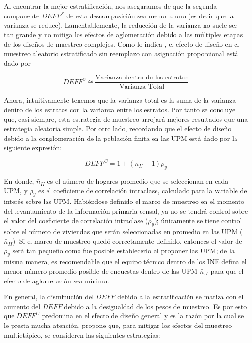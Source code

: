 \documentclass[
  12pt,
  spanish,
]{book}
\begin{document}
Al encontrar la mejor estratificación, nos aseguramos de que la segunda componente \(DEFF^S\) de esta descomposición sea menor a uno (es decir que la varianza se reduce). Lamentablemente, la reducción de la varianza no suele ser tan grande y no mitiga los efectos de aglomeración debido a las múltiples etapas de los diseños de muestreo complejos. Como lo indica \citet{Gutierrez_2016}, el efecto de diseño en el muestreo aleatorio estratificado sin reemplazo con asignación proporcional está dado por

\[
DEFF^S \cong\frac{\text{Varianza dentro de los estratos}}{\text{Varianza Total}}
\]

Ahora, intuitivamente tenemos que la varianza total es la suma de la varianza dentro de los estratos con la varianza entre los estratos. Por tanto se concluye que, casi siempre, esta estrategia de muestreo arrojará mejores resultados que una estrategia aleatoria simple. Por otro lado, recordando que el efecto de diseño debido a la conglomeración de la población finita en las UPM está dado por la siguiente expresión:

\[
DEFF^C = 1 + (\bar{n}_{II}-1)\rho_y
\]

En donde, \(\bar{n}_{II}\) es el número de hogares promedio que se seleccionan en cada UPM, y \(\rho_y\) es el coeficiente de correlación intraclase, calculado para la variable de interés sobre las UPM. Habiéndose definido el marco de muestreo en el momento del levantamiento de la información primaria censal, ya no se tendrá control sobre el valor del coeficiente de correlación intraclase (\(\rho_y\)); únicamente se tiene control sobre el número de viviendas que serán seleccionadas en promedio en las UPM (\(\bar{n}_{II}\)). Si el marco de muestreo quedó correctamente definido, entonces el valor de \(\rho_y\) será tan pequeño como fue posible establecerlo al proponer las UPM; de la misma manera, es recomendable que el equipo técnico dentro de los INE defina el menor número promedio posible de encuestas dentro de las UPM \(\bar{n}_{II}\) para que el efecto de aglomeración sea mínimo.

En general, la disminución del \(DEFF\) debido a la estratificación se matiza con el aumento del \(DEFF\) debido a la desigualdad de los pesos de muestreo. Es por esto que \(DEFF^C\) predomina en el efecto de diseño general y es la razón por la cual se le presta mucha atención. \citet{United_Nations_2008} propone que, para mitigar los efectos del muestreo multietápico, se consideren las siguientes estrategias:
\end{document}
